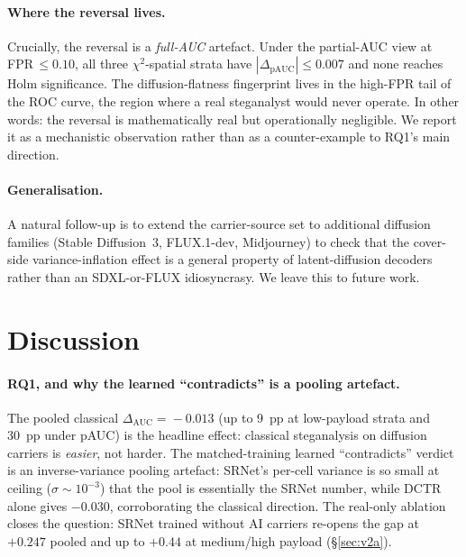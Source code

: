 \documentclass[10pt,twocolumn,a4paper]{article}
\DeclareRobustCommand{\by}[1]{\textnormal{\normalfont\footnotesize\space--- #1}}
\begin{document}
\paragraph{Where the reversal lives.} Crucially, the reversal is a \emph{full-AUC} artefact. Under the partial-AUC view at FPR\,$\leq\!0.10$, all three $\chi^2$-spatial strata have $|\Delta_\text{pAUC}|\!\leq\!0.007$ and none reaches Holm significance. The diffusion-flatness fingerprint lives in the high-FPR tail of the ROC curve, the region where a real steganalyst would never operate. In other words: the reversal is mathematically real but operationally negligible. We report it as a mechanistic observation rather than as a counter-example to RQ1's main direction.

\paragraph{Generalisation.} A natural follow-up is to extend the carrier-source set to additional diffusion families (Stable Diffusion~3, FLUX.1-dev, Midjourney) to check that the cover-side variance-inflation effect is a general property of latent-diffusion decoders rather than an SDXL-or-FLUX idiosyncrasy. We leave this to future work.

\section[Discussion\by{\textbf{Writer:} Nikolas Zouros \textbf{Reviewer:} Jimena \textbf{Contributor:}  David}]{Discussion}
\label{sec:discussion}


\paragraph{RQ1, and why the learned ``contradicts'' is a pooling artefact.} The pooled classical $\Delta_\text{AUC}\!=\!-0.013$ (up to 9~pp at low-payload strata and 30~pp under pAUC) is the headline effect: classical steganalysis on diffusion carriers is \emph{easier}, not harder. The matched-training learned ``contradicts'' verdict is an inverse-variance pooling artefact: SRNet's per-cell variance is so small at ceiling ($\sigma\!\sim\!10^{-3}$) that the pool is essentially the SRNet number, while DCTR alone gives $-0.030$, corroborating the classical direction. The real-only ablation closes the question: SRNet trained without AI carriers re-opens the gap at $+0.247$ pooled and up to $+0.44$ at medium/high payload (\S\ref{sec:v2a}).
\end{document}
